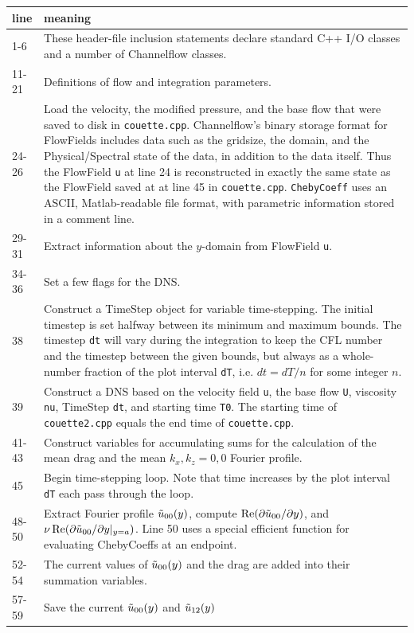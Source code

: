 \documentclass{article}[12pt]
\begin{document}
\begin{tabular}{p{2cm}p{12cm}}
line & meaning \\\hline
1-6 & These header-file inclusion statements declare standard
C++ I/O classes and a number of Channelflow classes.
\\
11-21 & Definitions of flow and integration parameters.
\\
24-26 & Load the velocity, the modified pressure, and
the base flow that were saved to disk in {\tt couette.cpp}. Channelflow's
binary storage format for FlowFields includes data such as the gridsize,
the domain, and the Physical/Spectral state of the data, in addition to
the data itself. Thus the FlowField {\tt u} at line 24 is reconstructed
in exactly the same state as the FlowField saved at at line 45 in
{\tt couette.cpp}. {\tt ChebyCoeff} uses an ASCII, Matlab-readable
file format, with parametric information stored in a comment line.
\\
29-31 & Extract information about the $y$-domain from FlowField
{\tt u}.
\\
34-36 & Set a few flags for the DNS.
\\
 38 & Construct a TimeStep object for variable time-stepping.
The initial timestep is set halfway between its minimum and maximum bounds.
The timestep {\tt dt} will vary during the integration to keep the CFL
number and the timestep between the given bounds, but always as a
whole-number fraction of the plot  interval {\tt dT}, i.e. $dt = dT/n$
for some integer $n$.
\\
 39 & Construct a DNS based on the velocity field {\tt u}, the base flow
{\tt U}, viscosity {\tt nu}, TimeStep {\tt dt}, and starting time {\tt T0}.
The starting time of {\tt couette2.cpp} equals the end time of
{\tt couette.cpp}.
\\
41-43 & Construct variables for accumulating sums for the
calculation of the mean drag and the mean $k_x,k_z=0,0$ Fourier profile.
\\
 45 & Begin time-stepping loop. Note that time increases by
the plot interval {\tt dT} each pass through the loop.
\\
48-50 & Extract Fourier profile $\tilde{u}_{00}(y)$, compute
$\operatorname{Re}(\partial \tilde{u}_{00} / \partial y)$, and $\nu \operatorname{Re}(\partial \tilde{u}_{00} / \partial y |_{y=a})$.
Line 50 uses a special efficient function for evaluating ChebyCoeffs at
an endpoint.
\\
52-54 & The current values of $\tilde{u}_{00}(y)$ and the drag
are added into their summation variables.
\\
57-59 & Save the current $\tilde{u}_{00}(y)$ and $\tilde{u}_{12}(y)$

\end{tabular}
\end{document}

